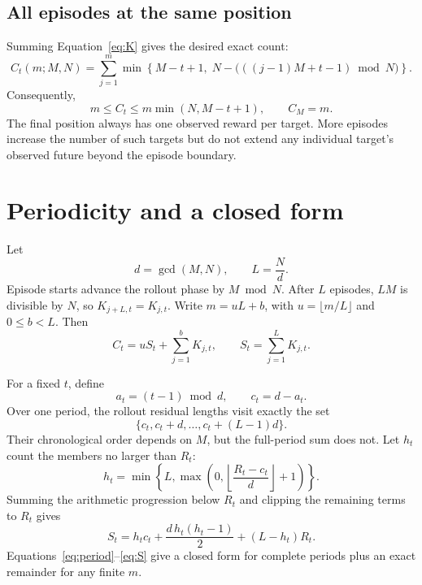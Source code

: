 \documentclass[11pt,a4paper]{article}
\numberwithin{equation}{section}
\begin{document}
\subsection{All episodes at the same position}
Summing Equation~\eqref{eq:K} gives the desired exact count:
\begin{equation}\label{eq:C}
 \boxed{C_t(m;M,N)=\sum_{j=1}^{m}\min\left\{M-t+1,\;
 N-\bigl(((j-1)M+t-1)\bmod N\bigr)\right\}.}
\end{equation}
Consequently,
\begin{equation}
 m\le C_t\le m\min(N,M-t+1),\qquad C_M=m.
\end{equation}
The final position always has one observed reward per target. More episodes
increase the number of such targets but do not extend any individual target's
observed future beyond the episode boundary.

\section{Periodicity and a closed form}
Let
\begin{equation}
 d=\gcd(M,N),\qquad L=\frac{N}{d}.
\end{equation}
Episode starts advance the rollout phase by $M\bmod N$. After $L$ episodes,
$LM$ is divisible by $N$, so $K_{j+L,t}=K_{j,t}$.
Write $m=uL+b$, with $u=\lfloor m/L\rfloor$ and $0\le b<L$. Then
\begin{equation}\label{eq:period}
 C_t=uS_t+\sum_{j=1}^{b}K_{j,t},\qquad
 S_t=\sum_{j=1}^{L}K_{j,t}.
\end{equation}

For a fixed $t$, define
\begin{equation}
 a_t=(t-1)\bmod d,\qquad c_t=d-a_t.
\end{equation}
Over one period, the rollout residual lengths visit exactly the set
\begin{equation}
 \{c_t,c_t+d,\ldots,c_t+(L-1)d\}.
\end{equation}
Their chronological order depends on $M$, but the full-period sum does not.
Let $h_t$ count the members no larger than $R_t$:
\begin{equation}\label{eq:h}
 h_t=\min\left\{L,\max\left(0,
 \left\lfloor\frac{R_t-c_t}{d}\right\rfloor+1\right)\right\}.
\end{equation}
Summing the arithmetic progression below $R_t$ and clipping the remaining terms
to $R_t$ gives
\begin{equation}\label{eq:S}
 \boxed{S_t=h_tc_t+\frac{d\,h_t(h_t-1)}{2}+(L-h_t)R_t.}
\end{equation}
Equations~\eqref{eq:period}--\eqref{eq:S} give a closed form for complete periods
plus an exact remainder for any finite $m$.
\end{document}
